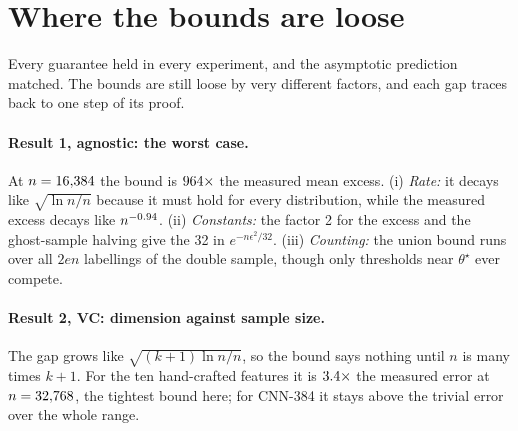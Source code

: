 \section{Where the bounds are loose}
\label{sec:looseness}

Every guarantee held in every experiment, and the asymptotic prediction matched. The bounds are
still loose by very different factors, and each gap traces back to one step of its proof.

\paragraph{Result 1, agnostic: the worst case.} At $n=16{,}384$ the bound is
$964\times$ the measured mean excess. (i) \emph{Rate:} it decays like
$\sqrt{\ln n/n}$ because it must hold for every distribution, while the measured excess decays like
$n^{-0.94}$. (ii) \emph{Constants:} the factor 2 for the excess and the ghost-sample halving give the 32 in
$e^{-n\epsilon^2/32}$. (iii) \emph{Counting:} the union bound runs over all $2en$ labellings of the
double sample, though only thresholds near $\theta^\star$ ever compete.

\paragraph{Result 2, VC: dimension against sample size.} The gap grows like $\sqrt{(k+1)\ln n/n}$, so
the bound says nothing until $n$ is many times $k+1$. For the ten hand-crafted features it is
$3.4\times$ the measured error at $n=32{,}768$, the tightest bound here; for CNN-384
it stays above the trivial error over the whole range.

